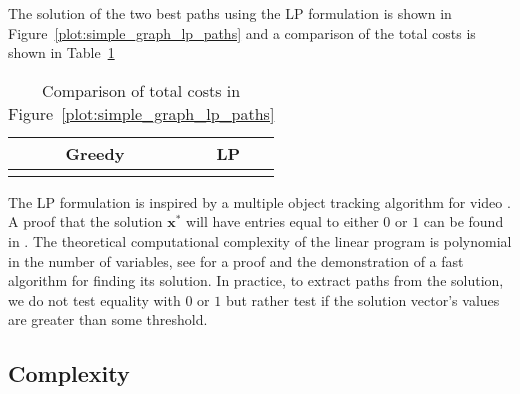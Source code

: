 \documentclass{article}
\begin{document}
\begin{sloppy}
The solution of the two best paths using the LP formulation
is shown in Figure~\ref{plot:simple_graph_lp_paths} and a comparison of the
total costs is shown in Table~\ref{tab:greedy_lp_cost_compare}

\begin{table}[!b]
    \caption{\label{tab:greedy_lp_cost_compare} Comparison of total costs in
    Figure~\ref{plot:simple_graph_lp_paths}}
    \begin{center}
        \begin{tabular}{c c}
            Greedy & LP \\
            \hline
             &
             \\
        \end{tabular}
    \end{center}
\end{table}

The LP formulation is inspired by a multiple object tracking algorithm for video
\cite{jiang2007linear}. A proof that the solution $\boldsymbol{x}^{\ast}$ will
have entries equal to either $0$ or $1$ can be found in
\cite[p.~167]{parker1988discrete}. The theoretical computational complexity of
the linear program is polynomial in the number of variables, see
\cite{karmarkar1984new} for a proof and the demonstration of a fast algorithm
for finding its solution. In practice, to extract paths from the solution, we do
not test equality with $0$ or $1$ but rather test if the solution vector's
values are greater than some threshold. 

\subsection{Complexity}


\end{sloppy}
\end{document}
